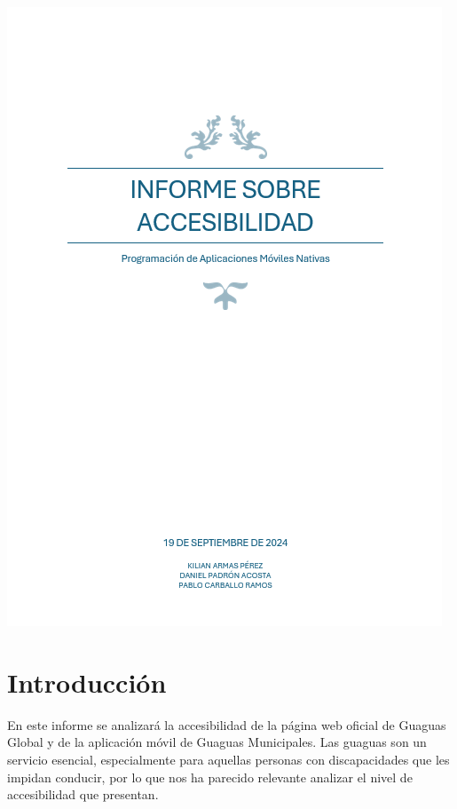 \documentclass[a4paper,12pt]{article}
\begin{document}
\begin{titlepage}
    \centering
    \includegraphics[width=\textwidth]{Images/portada.png}
\end{titlepage}

\newpage

\renewcommand{\contentsname}{Índice}

\tableofcontents

\newpage

\section{Introducción}
En este informe se analizará la accesibilidad de la página web oficial de Guaguas Global y de la aplicación móvil de Guaguas Municipales. Las guaguas son un servicio esencial, especialmente para aquellas personas con discapacidades que les impidan conducir, por lo que nos ha parecido relevante analizar el nivel de accesibilidad que presentan. 
\end{document}
